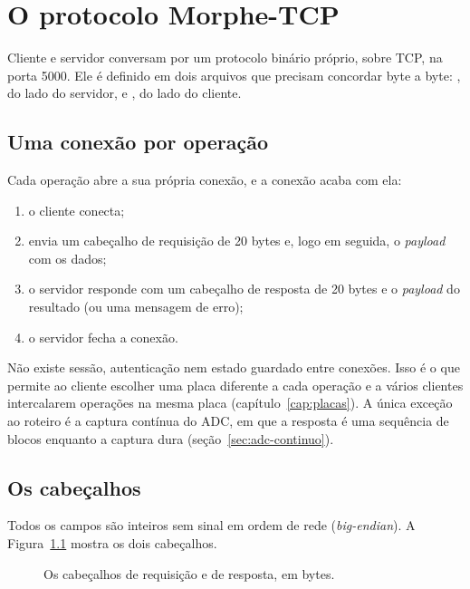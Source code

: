 \chapter{O protocolo Morphe-TCP}
\label{cap:protocolo}

Cliente e servidor conversam por um protocolo binário próprio, sobre TCP, na
porta 5000. Ele é definido em dois arquivos que precisam concordar byte a byte:
, do lado do servidor, e
, do lado do cliente.

\section{Uma conexão por operação}

Cada operação abre a sua própria conexão, e a conexão acaba com ela:

\begin{enumerate}
  \item o cliente conecta;
  \item envia um cabeçalho de requisição de 20 bytes e, logo em seguida, o
    \emph{payload} com os dados;
  \item o servidor responde com um cabeçalho de resposta de 20 bytes e o
    \emph{payload} do resultado (ou uma mensagem de erro);
  \item o servidor fecha a conexão.
\end{enumerate}

Não existe sessão, autenticação nem estado guardado entre conexões. Isso é o
que permite ao cliente escolher uma placa diferente a cada operação e a vários
clientes intercalarem operações na mesma placa (capítulo~\ref{cap:placas}). A
única exceção ao roteiro é a captura contínua do ADC, em que a resposta é uma
sequência de blocos enquanto a captura dura (seção~\ref{sec:adc-continuo}).

\section{Os cabeçalhos}

Todos os campos são inteiros sem sinal em ordem de rede
(\emph{big-endian}). A Figura~\ref{fig:protocolo} mostra os dois cabeçalhos.

\begin{figure}[htbp]
  \centering
  \caption{Os cabeçalhos de requisição e de resposta, em bytes.}
  \label{fig:protocolo}
\end{figure}

